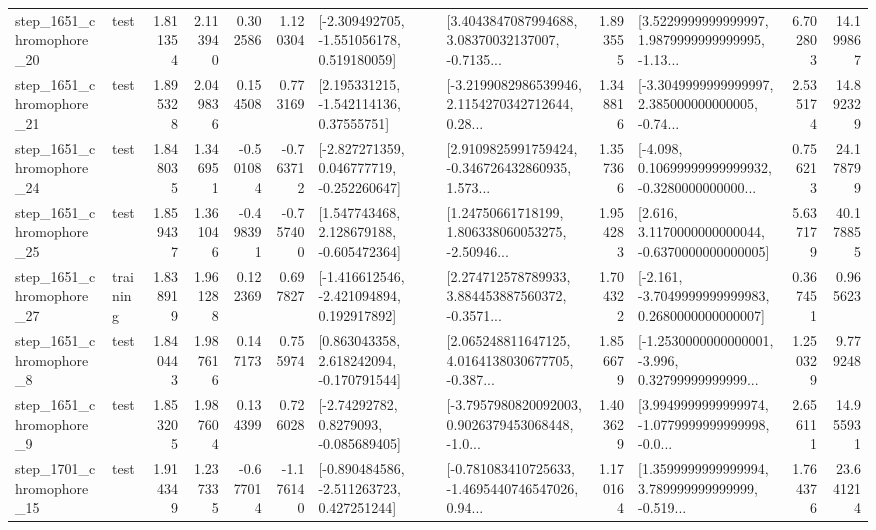 \begin{tabular}{llrrrrllrlrr}
 step\_1651\_chromophore\_20 &      test &      1.811354 &    2.113940 &      0.302586 &  1.120304 &   [-2.309492705, -1.551056178, 0.519180059] &  [3.4043847087994688, 3.08370032137007, -0.7135... &       1.893555 &  [3.5229999999999997, 1.9879999999999995, -1.13... &            6.702803 &         14.199867 \\
 step\_1651\_chromophore\_21 &      test &      1.895328 &    2.049836 &      0.154508 &  0.773169 &     [2.195331215, -1.542114136, 0.37555751] &  [-3.2199082986539946, 2.1154270342712644, 0.28... &       1.348816 &  [-3.3049999999999997, 2.385000000000005, -0.74... &            2.535174 &         14.892329 \\
 step\_1651\_chromophore\_24 &      test &      1.848035 &    1.346951 &     -0.501084 & -0.763712 &   [-2.827271359, 0.046777719, -0.252260647] &  [2.9109825991759424, -0.346726432860935, 1.573... &       1.357366 &  [-4.098, 0.10699999999999932, -0.3280000000000... &            0.756213 &         24.178799 \\
 step\_1651\_chromophore\_25 &      test &      1.859437 &    1.361046 &     -0.498391 & -0.757400 &    [1.547743468, 2.128679188, -0.605472364] &  [1.24750661718199, 1.806338060053275, -2.50946... &       1.954283 &   [2.616, 3.1170000000000044, -0.6370000000000005] &            5.637179 &         40.178855 \\
 step\_1651\_chromophore\_27 &  training &      1.838919 &    1.961288 &      0.122369 &  0.697827 &   [-1.416612546, -2.421094894, 0.192917892] &  [2.274712578789933, 3.884453887560372, -0.3571... &       1.704322 &  [-2.161, -3.7049999999999983, 0.2680000000000007] &            0.367451 &          0.965623 \\
  step\_1651\_chromophore\_8 &      test &      1.840443 &    1.987616 &      0.147173 &  0.755974 &    [0.863043358, 2.618242094, -0.170791544] &  [2.065248811647125, 4.0164138030677705, -0.387... &       1.856679 &  [-1.2530000000000001, -3.996, 0.32799999999999... &            1.250329 &          9.779248 \\
  step\_1651\_chromophore\_9 &      test &      1.853205 &    1.987604 &      0.134399 &  0.726028 &      [-2.74292782, 0.8279093, -0.085689405] &  [-3.7957980820092003, 0.9026379453068448, -1.0... &       1.403629 &  [3.9949999999999974, -1.0779999999999998, -0.0... &            2.656111 &         14.955931 \\
 step\_1701\_chromophore\_15 &      test &      1.914349 &    1.237335 &     -0.677014 & -1.176140 &   [-0.890484586, -2.511263723, 0.427251244] &  [-0.781083410725633, -1.4695440746547026, 0.94... &       1.170164 &  [1.3599999999999994, 3.789999999999999, -0.519... &            1.764376 &         23.641214 \\

\end{tabular}
